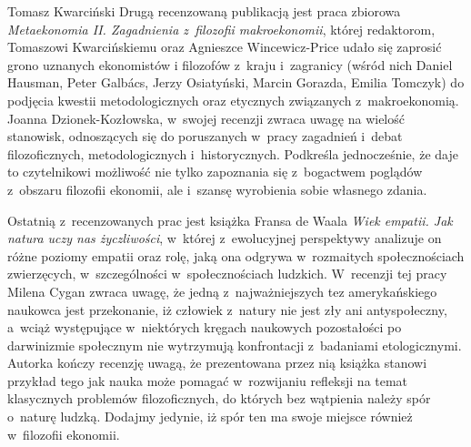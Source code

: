 \begin{editorial}{Tomasz Kwarciński}
Drugą recenzowaną publikacją jest praca zbiorowa \textit{Metaekonomia II. Zagadnienia z~filozofii makroekonomii}, której
redaktorom, Tomaszowi Kwarcińskiemu oraz Agnieszce Wincewicz-Price udało się zaprosić grono uznanych ekonomistów i
filozofów z~kraju i~zagranicy (wśród nich Daniel Hausman, Peter Galbács, Jerzy Osiatyński, Marcin Gorazda, Emilia Tomczyk)
do podjęcia
kwestii metodologicznych oraz etycznych związanych z~makroekonomią. Joanna Dzionek-Kozłowska, w~swojej recenzji zwraca
uwagę na
wielość stanowisk, odnoszących się do poruszanych w~pracy zagadnień i~debat filozoficznych,
metodologicznych i~historycznych. Podkreśla jednocześnie, że daje to czytelnikowi
możliwość nie tylko zapoznania się z~bogactwem poglądów z~obszaru filozofii ekonomii, ale i~szansę wyrobienia sobie własnego zdania.

Ostatnią z~recenzowanych prac jest książka Fransa de Waala \textit{Wiek
empatii. Jak natura uczy nas życzliwości}, w~której z~ewolucyjnej
perspektywy analizuje on różne poziomy empatii oraz rolę, jaką ona
odgrywa w~rozmaitych społecznościach zwierzęcych, w~szczególności w~społecznościach
ludzkich. W~recenzji tej pracy Milena Cygan zwraca
uwagę, że jedną z~najważniejszych tez amerykańskiego naukowca jest
przekonanie, iż człowiek z~natury nie jest zły ani antyspołeczny, a~wciąż
występujące w~niektórych kręgach naukowych pozostałości po
darwinizmie społecznym nie wytrzymują konfrontacji z~badaniami
etologicznymi. Autorka kończy recenzję uwagą, że prezentowana
przez nią książka stanowi przykład tego jak nauka może pomagać w~rozwijaniu
refleksji na temat klasycznych problemów filozoficznych, do
których bez wątpienia należy spór o~naturę ludzką. Dodajmy jedynie, iż
spór ten ma swoje miejsce również w~filozofii ekonomii.

\end{editorial}